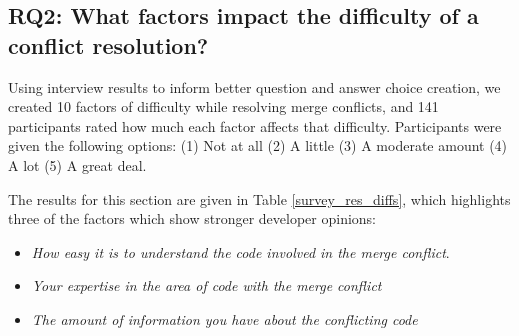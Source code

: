 \subsection{\textbf{RQ2:} What factors impact the difficulty of a conflict resolution?}\label{RQ2}

Using interview results to inform better question and answer choice creation, we created 10 factors of difficulty while resolving merge conflicts, and 141 participants rated how much each factor affects that difficulty. Participants were given the following options:
(1) Not at all (2) A little (3) A moderate amount (4) A lot (5) A great deal.

The results for this section are given in Table \ref{survey_res_diffs}, which highlights three of the factors which show stronger developer opinions:
\begin{itemize}
\item \textit{How easy it is to understand the code involved in the merge conflict}. 
\item \textit{Your expertise in the area of code with the merge conflict}
\item \textit{The amount of information you have about the conflicting code} 
\end{itemize} 

